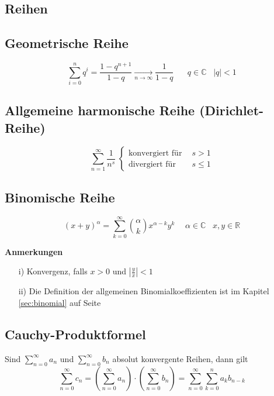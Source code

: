 \documentclass[8pt, a4paper, landscape, fleqn]{scrartcl}
\newenvironment {example}
				{\begin{itshape} \begin{small}}
				{\end{small} \end{itshape}}
\newenvironment {eq}
				{\begin{equation*}}
				{\end{equation*}}
\begin{document}
\begin{multicols*}{3}
		\section{Reihen}
			\subsection{Geometrische Reihe}
				\begin{eq}
					\sum_{i=0}^{n}q^i= \frac{1-q^{n+1}}{1-q} \xrightarrow[n \to \infty]{} \frac{1}{1-q}\hspace{20pt} q \in \mathbb{C} \hspace{10pt} \vert q \vert <1
				\end{eq}
			\subsection{Allgemeine harmonische Reihe (Dirichlet-Reihe)}
				\begin{eq}
					\sum_{n=1}^{\infty} \frac{1}{n^s} \hspace{3pt}
					\begin{cases}							
						\text{konvergiert für} \hspace{5pt} &s>1\\
						\text{divergiert für} &s \le 1
					\end{cases}
				\end{eq}
			\subsection{Binomische Reihe}
				\begin{eq}
					(x+y)^{\alpha}=\sum_{k=0}^{\infty} \binom{\alpha}{k}x^{\alpha-k}y^k \hspace{15pt} \alpha \in \mathbb{C} \hspace{10pt} x, y \in \mathbb{R}
				\end{eq}
				\begin{example}
					\textbf{Anmerkungen}
					\begin{enumerate}
						\item[i)] Konvergenz, falls $x>0$ und $\left \vert \frac{y}{x}\right \vert <1$
						\item[ii)] Die Definition der allgemeinen Binomialkoeffizienten ist im Kapitel \ref{sec:binomial} auf Seite \pageref{sec:binomial}
					\end{enumerate}
				\end{example}	
			\subsection{Cauchy-Produktformel}
			Sind $\sum_{n=0}^{\infty}a_n$ und $	\sum_{n=0}^{\infty}b_n$	absolut konvergente Reihen, dann gilt
			\begin{equation*}
				\sum_{n=0}^{\infty}c_n=\left(\sum_{n=0}^{\infty}a_n\right)\cdot\left(\sum_{n=0}^{\infty}b_n\right)=\sum_{n=0}^{\infty}\sum_{k=0}^{n}a_kb_{n-k}
			\end{equation*}

\end{multicols*}
\end{document}
